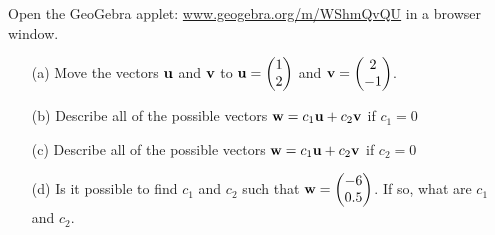 \begin{problem}
    Open the GeoGebra applet:
    \href{https://www.geogebra.org/m/WShmQvQU}{www.geogebra.org/m/WShmQvQU} in a browser window.
    \begin{enumerate}
        \item[(a)] Move the vectors ${\bf u}$ and ${\bf v}$ to ${\bf u} = \begin{pmatrix} 1 \\
                2\end{pmatrix}$ and ${\bf v} = \begin{pmatrix} 2\\-1\end{pmatrix}$.
        \item[(b)] Describe all of the possible vectors ${\bf w} = c_1 {\bf u} + c_2 {\bf v}$ if $c_1
            = 0$
        \item[(c)] Describe all of the possible vectors ${\bf w} = c_1 {\bf u} + c_2 {\bf v}$ if $c_2
            = 0$
        \item[(d)] Is it possible to find $c_1$ and $c_2$ such that ${\bf w} = \begin{pmatrix} -6
                \\ 0.5 \end{pmatrix}$.  If so, what are $c_1$ and $c_2$.
    \end{enumerate}
\end{problem}

